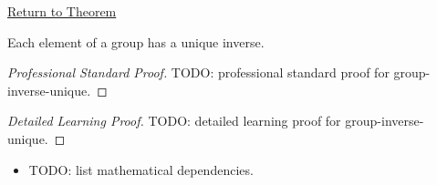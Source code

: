 \newpage
{}
\label{prf:group-inverse-unique}

\begin{remark*}[Return]
\hyperref[prop:group-inverse-unique]{Return to Theorem}
\end{remark*}

\begin{proposition*}
Each element of a group has a unique inverse.
\end{proposition*}

\begin{proof}[Professional Standard Proof]
\LRAProofBodyStart
TODO: professional standard proof for group-inverse-unique.
\end{proof}

\begin{proof}[Detailed Learning Proof]
\LRAProofBodyStart
TODO: detailed learning proof for group-inverse-unique.
\end{proof}

\begin{remark*}
\end{remark*}

\begin{dependencies}
\begin{itemize}
  \item TODO: list mathematical dependencies.
\end{itemize}
\end{dependencies}

\clearpage

